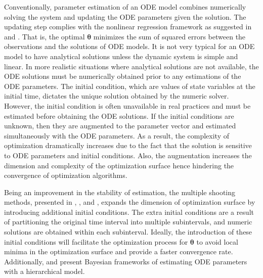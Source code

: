 Conventionally, parameter estimation of an ODE model combines numerically solving the system and updating the ODE parameters given the solution. The updating step complies with the nonlinear regression framework as suggested in \cite{nonlinearestBARD} and \cite{nonlinearparameterestimation}. That is, the optimal $\bm{\theta}$ minimizes the sum of squared errors between the observations and the solutions of ODE models. It is not very typical for an ODE model to have analytical solutions unless the dynamic system is simple and linear. In more realistic situations where analytical solutions are not available, the ODE solutions must be numerically obtained prior to any estimations of the ODE parameters. The initial condition, which are values of state variables at the initial time, dictates the unique solution obtained by the numeric solver. However, the initial condition is often unavailable in real practices and must be estimated before obtaining the ODE solutions. If the initial conditions are unknown, then they are augmented to the parameter vector and estimated simultaneously with the ODE parameters. As a result, the complexity of optimization dramatically increases due to the fact that the solution is sensitive to ODE parameters and initial conditions. Also, the augmentation increases the dimension and complexity of the optimization surface hence hindering the convergence of optimization algorithms.

Being an improvement in the stability of estimation, the multiple shooting methods, presented in \cite{BOCKmultiple}, \cite{peifermultiple}, and \cite{nonlineardynamic}, expands the dimension of optimization surface by introducing additional initial conditions. The extra initial conditions are a result of partitioning the original time interval into multiple subintervals, and numeric solutions are obtained within each subinterval. Ideally, the introduction of these initial conditions will facilitate the optimization process for $\bm{\theta}$ to avoid local minima in the optimization surface and provide a faster convergence rate. Additionally, \cite{Huang_bayesian} and \cite{Gelman_bayesian} present Bayesian frameworks of estimating ODE parameters with a hierarchical model. 

